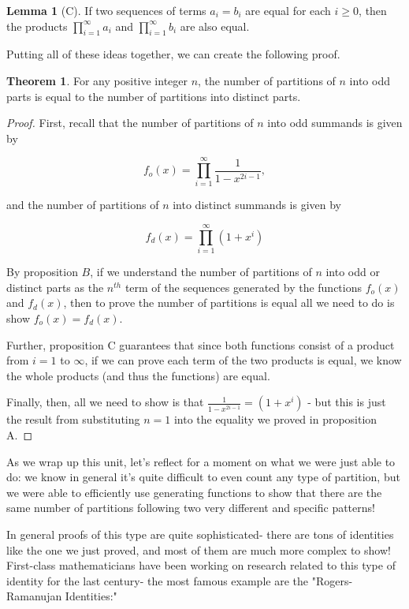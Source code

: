 \documentclass{article}
\theoremstyle{definition}
\newtheorem{theorem}{Theorem}
\newtheorem{lemma}{Lemma}
\begin{document}
\begin{lemma}[C]
If two sequences of terms $a_{i}=b_{i}$ are equal for each $i \geq 0$, then the products $\prod_{i=1}^{\infty} a_{i}$ and $\prod_{i=1}^{\infty} b_{i}$ are also equal.
\end{lemma}

Putting all of these ideas together, we can create the following proof.

\begin{theorem}
For any positive integer $n$, the number of partitions of $n$ into odd parts is equal to the number of partitions into distinct parts.
\end{theorem}

\begin{proof}
First, recall that the number of partitions of $n$ into odd summands is given by

$$
f_{o}(x)=\prod_{i=1}^{\infty} \frac{1}{1-x^{2 i-1}},
$$

and the number of partitions of $n$ into distinct summands is given by

$$
f_{d}(x)=\prod_{i=1}^{\infty}\left(1+x^{i}\right)
$$

By proposition $B$, if we understand the number of partitions of $n$ into odd or distinct parts as the $n^{t h}$ term of the sequences generated by the functions $f_{o}(x)$ and $f_{d}(x)$, then to prove the number of partitions is equal all we need to do is show $f_{o}(x)=f_{d}(x)$.

Further, proposition C guarantees that since both functions consist of a product from $i=1$ to $\infty$, if we can prove each term of the two products is equal, we know the whole products (and thus the functions) are equal.

Finally, then, all we need to show is that $\frac{1}{1-x^{2 i-1}}=\left(1+x^{i}\right)$ - but this is just the result from substituting $n=1$ into the equality we proved in proposition A.
\end{proof}

As we wrap up this unit, let's reflect for a moment on what we were just able to do: we know in general it's quite difficult to even count any type of partition, but we were able to efficiently use generating functions to show that there are the same number of partitions following two very different and specific patterns!

In general proofs of this type are quite sophisticated- there are tons of identities like the one we just proved, and most of them are much more complex to show! First-class mathematicians have been working on research related to this type of identity for the last century- the most famous example are the "Rogers-Ramanujan Identities:"
\end{document}

